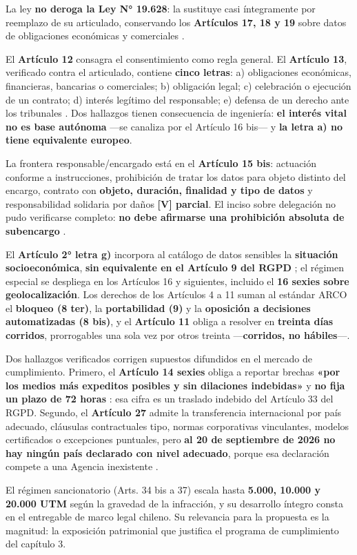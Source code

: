 La ley \textbf{no deroga la Ley N° 19.628}: la sustituye casi íntegramente por reemplazo de su articulado, conservando los \textbf{Artículos 17, 18 y 19} sobre datos de obligaciones económicas y comerciales .

El \textbf{Artículo 12} consagra el consentimiento como regla general. El \textbf{Artículo 13}, verificado contra el articulado, contiene \textbf{cinco letras}: a) obligaciones económicas, financieras, bancarias o comerciales; b) obligación legal; c) celebración o ejecución de un contrato; d) interés legítimo del responsable; e) defensa de un derecho ante los tribunales . Dos hallazgos tienen consecuencia de ingeniería: \textbf{el interés vital no es base autónoma} ---se canaliza por el Artículo 16 bis--- y \textbf{la letra a) no tiene equivalente europeo}.

La frontera responsable/encargado está en el \textbf{Artículo 15 bis}: actuación conforme a instrucciones, prohibición de tratar los datos para objeto distinto del encargo, contrato con \textbf{objeto, duración, finalidad y tipo de datos} y responsabilidad solidaria por daños \textbf{{[}V{]} parcial}. El inciso sobre delegación no pudo verificarse completo: \textbf{no debe afirmarse una prohibición absoluta de subencargo} .

El \textbf{Artículo 2° letra g)} incorpora al catálogo de datos sensibles la \textbf{situación socioeconómica}, \textbf{sin equivalente en el Artículo 9 del RGPD} ; el régimen especial se despliega en los Artículos 16 y siguientes, incluido el \textbf{16 sexies sobre geolocalización}. Los derechos de los Artículos 4 a 11 suman al estándar ARCO el \textbf{bloqueo (8 ter)}, la \textbf{portabilidad (9)} y la \textbf{oposición a decisiones automatizadas (8 bis)}, y el \textbf{Artículo 11} obliga a resolver en \textbf{treinta días corridos}, prorrogables una sola vez por otros treinta ---\textbf{corridos, no hábiles}---.

Dos hallazgos verificados corrigen supuestos difundidos en el mercado de cumplimiento. Primero, el \textbf{Artículo 14 sexies} obliga a reportar brechas \textbf{«por los medios más expeditos posibles y sin dilaciones indebidas»} y \textbf{no fija un plazo de 72 horas} : esa cifra es un traslado indebido del Artículo 33 del RGPD. Segundo, el \textbf{Artículo 27} admite la transferencia internacional por país adecuado, cláusulas contractuales tipo, normas corporativas vinculantes, modelos certificados o excepciones puntuales, pero \textbf{al 20 de septiembre de 2026 no hay ningún país declarado con nivel adecuado}, porque esa declaración compete a una Agencia inexistente .

El régimen sancionatorio (Arts. 34 bis a 37) escala hasta \textbf{5.000, 10.000 y 20.000 UTM} según la gravedad de la infracción, y su desarrollo íntegro consta en el entregable de marco legal chileno. Su relevancia para la propuesta es la magnitud: la exposición patrimonial que justifica el programa de cumplimiento del capítulo 3.
